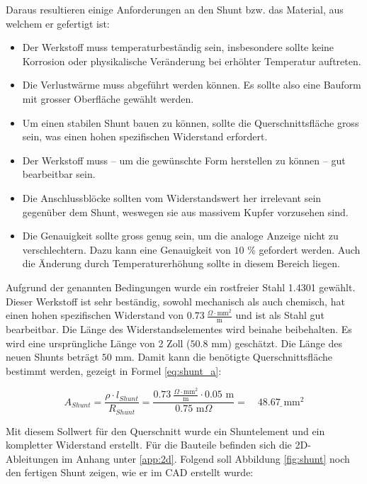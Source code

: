 Daraus resultieren einige Anforderungen an den Shunt bzw. das Material, aus welchem er gefertigt ist: \begin{itemize}
	\item Der Werkstoff muss temperaturbeständig sein, insbesondere sollte keine Korrosion oder physikalische Veränderung bei erhöhter Temperatur auftreten.
	\item Die Verlustwärme muss abgeführt werden können. Es sollte also eine Bauform mit grosser Oberfläche gewählt werden.
	\item Um einen stabilen Shunt bauen zu können, sollte die Querschnittsfläche gross sein, was einen hohen spezifischen Widerstand erfordert.\newpage
	\item Der Werkstoff muss -- um die gewünschte Form herstellen zu können -- gut bearbeitbar sein.
	\item Die Anschlussblöcke sollten vom Widerstandswert her irrelevant sein gegenüber dem Shunt, weswegen sie aus massivem Kupfer vorzusehen sind.
	\item Die Genauigkeit sollte gross genug sein, um die analoge Anzeige nicht zu verschlechtern. Dazu kann eine Genauigkeit von $10$ \% gefordert werden. Auch die Änderung durch Temperaturerhöhung sollte in diesem Bereich liegen.
\end{itemize}

Aufgrund der genannten Bedingungen wurde ein rostfreier Stahl 1.4301 \cite{4301} gewählt. Dieser Werkstoff ist sehr beständig, sowohl mechanisch als auch chemisch, hat einen hohen spezifischen Widerstand von $0.73\ \frac{\Omega \cdot \text{mm}^2}{\text{m}}$ und ist als Stahl gut bearbeitbar. Die Länge des Widerstandselementes wird beinahe beibehalten. Es wird eine ursprüngliche Länge von 2 Zoll ($50.8$ mm) geschätzt. Die Länge des neuen Shunts beträgt $50$ mm. Damit kann die benötigte Querschnittsfläche bestimmt werden, gezeigt in Formel \ref{eq:shunt_a}:

\begin{equation}
	A_{Shunt}=\frac{\rho\cdot l_{Shunt}}{R_{Shunt}}=\frac{0.73\ \frac{\Omega\cdot\text{mm}^2}{\text{m}}\cdot 0.05\text{ m}}{0.75\text{ m}\Omega}=\quad\underline{48.67\text{ mm}^2}
\label{eq:shunt_a}
\end{equation}

Mit diesem Sollwert für den Querschnitt wurde ein Shuntelement und ein kompletter Widerstand erstellt. Für die Bauteile befinden sich die 2D-Ableitungen im Anhang unter \ref{app:2d}. Folgend soll Abbildung \ref{fig:shunt} noch den fertigen Shunt zeigen, wie er im CAD erstellt wurde:

